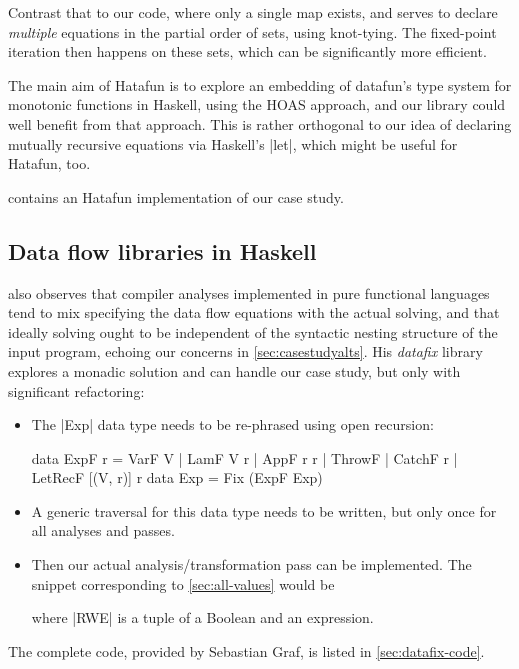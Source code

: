 \documentclass[manuscript,screen,acmsmall,nonacm]{acmart}
\begin{document}
Contrast that to our code, where only a single map exists, and serves to declare \emph{multiple} equations in the partial order of sets, using knot-tying. The fixed-point iteration then happens on these sets, which can be significantly more efficient.

The main aim of Hatafun is to explore an embedding of datafun's type system for monotonic functions in Haskell, using the HOAS approach, and our library could well benefit from that approach. This is rather orthogonal to our idea of declaring mutually recursive equations via Haskell's |let|, which might be useful for Hatafun, too.

 contains an Hatafun implementation of our case study.

\subsection{Data flow libraries in Haskell}\label{sec:datafix}

 also observes that compiler analyses implemented in pure functional languages tend to mix specifying the data flow equations with the actual solving, and that ideally solving ought to be independent of the syntactic nesting structure of the input program, echoing our concerns in \cref{sec:casestudyalts}. His \emph{datafix} library explores a monadic solution and can handle our case study, but only with significant refactoring:
\begin{itemize}
\item The |Exp| data type needs to be re-phrased using open recursion:
\begin{code}
data ExpF r =  VarF V | LamF V r | AppF r r | ThrowF | CatchF r | LetRecF [(V, r)] r
data Exp = Fix (ExpF Exp)
\end{code}
\item A generic traversal for this data type needs to be written, but only once for all analyses and passes.
\item Then our actual analysis/transformation pass can be implemented. The snippet corresponding to \cref{sec:all-values} would be
where |RWE| is a tuple of a Boolean and an expression.
\end{itemize}
The complete code, provided by Sebastian Graf, is listed in \cref{sec:datafix-code}.
\end{document}
